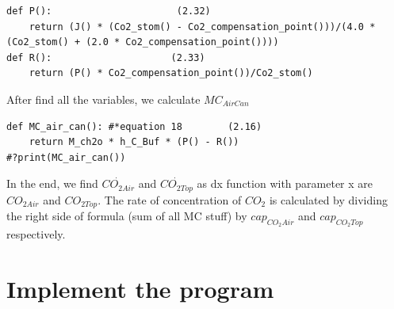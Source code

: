 \documentclass[a4paper]{article}
\numberwithin{equation}{section}
\begin{document}
\begin{itemize}
\begin{mdframed}[leftline=false,rightline=false,backgroundcolor=cyan!10]
\begin{verbatim}
def P():                      (2.32)
    return (J() * (Co2_stom() - Co2_compensation_point()))/(4.0 * (Co2_stom() + (2.0 * Co2_compensation_point())))
def R():                     (2.33) 
    return (P() * Co2_compensation_point())/Co2_stom()
\end{verbatim}
\end{mdframed}
After find all the variables, we calculate $MC_{AirCan}$
\begin{mdframed}[leftline=false,rightline=false,backgroundcolor=cyan!10]
  \begin{verbatim}
def MC_air_can(): #*equation 18        (2.16)
    return M_ch2o * h_C_Buf * (P() - R())
#?print(MC_air_can())
\end{verbatim}
\end{mdframed}
\end{itemize}

In the end, we find $\dot{CO_{2Air}}$ and $\dot{CO_{2Top}}$ as dx function with parameter x are $CO_{2Air}$ and $CO_{2Top}$. The rate of concentration of $CO_2$ is calculated by dividing the right side of formula (sum of all MC stuff) by $cap_{CO_2Air}$ and $cap_{CO_2Top}$ respectively. 


\section{Implement the program}
\end{document}
